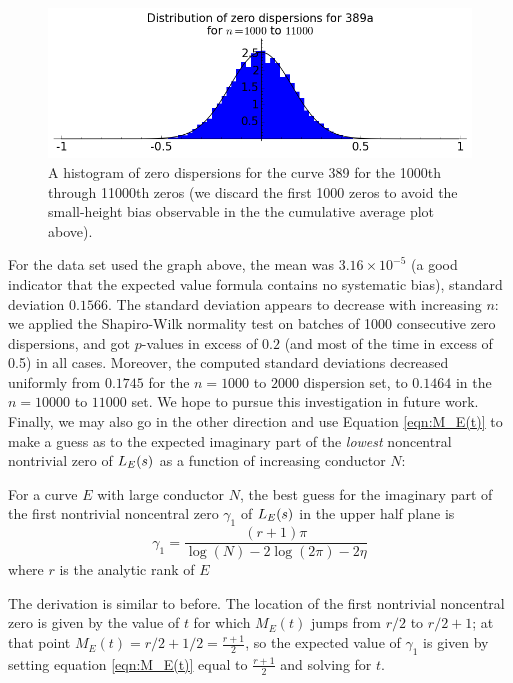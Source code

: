 \begin{figure}[!h]
    \centering
    \includegraphics[width=1.0\textwidth]{graphics/389a_zero_dispersions_histagram.png}
    \caption{A histogram of zero dispersions for the curve 389 for the 1000th through 11000th zeros (we discard the first 1000 zeros to avoid the small-height bias observable in the the cumulative average plot above). }
    \label{fig:389a_zero_dispersions_histagram}
\end{figure}

For the data set used the graph above, the mean was $3.16\times10^{-5}$ (a good indicator that the expected value formula contains no systematic bias), standard deviation $0.1566$. The standard deviation appears to decrease with increasing $n$: we applied the Shapiro-Wilk normality test on batches of 1000 consecutive zero dispersions, and got $p$-values in excess of $0.2$ (and most of the time in excess of 0.5) in all cases. Moreover, the computed standard deviations decreased uniformly from $0.1745$ for the $n=1000$ to $2000$ dispersion set, to $0.1464$ in the $n=10000$ to $11000$ set. We hope to pursue this investigation in future work. \\

Finally, we may also go in the other direction and use Equation \ref{eqn:M_E(t)} to make a guess as to the expected imaginary part of the {\it lowest} noncentral nontrivial zero of $L_E(s)$ as a function of increasing conductor $N$:
\begin{proposition}
For a curve $E$ with large conductor $N$, the best guess for the imaginary part of the first nontrivial noncentral zero $\gamma_1$ of $L_E(s)$ in the upper half plane is
\begin{equation}
\gamma_1 = \frac{(r+1)\pi}{\log(N) -2\log(2\pi) -2\eta}
\end{equation}
where $r$ is the analytic rank of $E$
\end{proposition}
The derivation is similar to before. The location of the first nontrivial noncentral zero is given by the value of $t$ for which $M_E(t)$ jumps from $r/2$ to $r/2+1$; at that point $M_E(t) = r/2 + 1/2 = \frac{r+1}{2}$, so the expected value of $\gamma_1$ is given by setting equation \ref{eqn:M_E(t)} equal to $\frac{r+1}{2}$ and solving for $t$. \\

